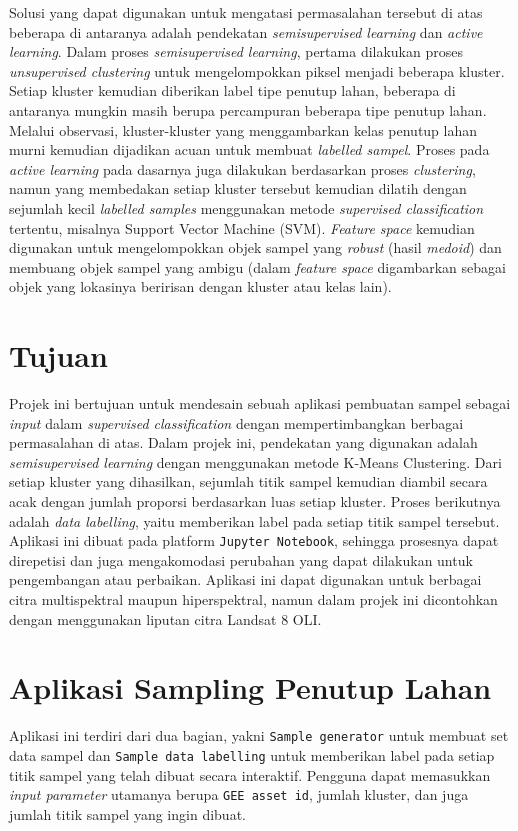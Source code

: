\documentclass[a4paper,12pt]{article}
\begin{document}
Solusi yang dapat digunakan untuk mengatasi permasalahan tersebut di atas beberapa di antaranya adalah pendekatan \textit{semisupervised learning} dan \textit{active learning}. Dalam proses \textit{semisupervised learning}, pertama dilakukan proses \textit{unsupervised clustering} untuk mengelompokkan piksel menjadi beberapa kluster. Setiap kluster kemudian diberikan label tipe penutup lahan, beberapa di antaranya mungkin masih berupa percampuran beberapa tipe penutup lahan. Melalui observasi, kluster-kluster yang menggambarkan kelas penutup lahan murni kemudian dijadikan acuan untuk membuat \textit{labelled sampel}. Proses pada \textit{active learning} pada dasarnya juga dilakukan berdasarkan proses \textit{clustering}, namun yang membedakan setiap kluster tersebut kemudian dilatih dengan sejumlah kecil \textit{labelled samples} menggunakan metode \textit{supervised classification} tertentu, misalnya Support Vector Machine (SVM)\cite{patra2012}. \textit{Feature space} kemudian digunakan untuk mengelompokkan objek sampel yang \textit{robust} (hasil \textit{medoid}) dan membuang objek sampel yang ambigu (dalam \textit{feature space} digambarkan sebagai objek yang lokasinya beririsan dengan kluster atau kelas lain).

\section{Tujuan}
Projek ini bertujuan untuk mendesain sebuah aplikasi pembuatan sampel sebagai \textit{input} dalam \textit{supervised classification} dengan mempertimbangkan berbagai permasalahan di atas. Dalam projek ini, pendekatan yang digunakan adalah \textit{semisupervised learning} dengan menggunakan metode K-Means Clustering. Dari setiap kluster yang dihasilkan, sejumlah titik sampel kemudian diambil secara acak dengan jumlah proporsi berdasarkan luas setiap kluster. Proses berikutnya adalah \textit{data labelling}, yaitu memberikan label pada setiap titik sampel tersebut. Aplikasi ini dibuat pada platform \texttt{Jupyter Notebook}, sehingga prosesnya dapat direpetisi dan juga mengakomodasi perubahan yang dapat dilakukan untuk pengembangan atau perbaikan. Aplikasi ini dapat digunakan untuk berbagai citra multispektral maupun hiperspektral, namun dalam projek ini dicontohkan dengan menggunakan liputan citra Landsat 8 OLI.

\section{Aplikasi Sampling Penutup Lahan}
Aplikasi ini terdiri dari dua bagian, yakni \texttt{Sample generator} untuk membuat set data sampel dan \texttt{Sample data labelling} untuk memberikan label pada setiap titik sampel yang telah dibuat secara interaktif. Pengguna dapat memasukkan \textit{input parameter} utamanya berupa \texttt{GEE asset id}, jumlah kluster, dan juga jumlah titik sampel yang ingin dibuat. 
\end{document}
